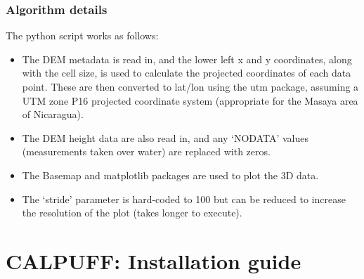 \documentclass[10pt,a4paper]{article}
\begin{document}
\subsubsection{Algorithm details}
The python script works as follows:
\begin{itemize}
\item The DEM metadata is read in, and the lower left x and y coordinates, along with the cell size, is used to calculate the projected coordinates of each data point. These are then converted to lat/lon using the utm package, assuming a UTM zone P16 projected coordinate system (appropriate for the Masaya area of Nicaragua).
\item The DEM height data are also read in, and any `NODATA' values (measurements taken over water) are replaced with zeros.
\item The Basemap and matplotlib packages are used to plot the 3D data.
\item The `stride' parameter is hard-coded to 100 but can be reduced to increase the resolution of the plot (takes longer to execute).
\end{itemize}

\section{CALPUFF: Installation guide}
\end{document}
